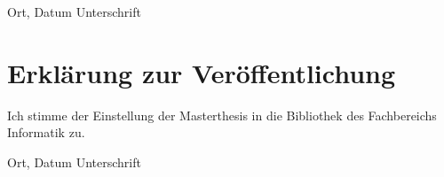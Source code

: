 \documentclass[12pt,final,twoside]{report}
\newcommand{\trtype}{Masterthesis} %
\theoremstyle{plain}
\theoremstyle{definition}
\theoremstyle{remark}
\begin{document}
\vspace{4cm}
\noindent Ort, Datum \hfill Unterschrift

\newpage
\thispagestyle{empty}
\hspace{1cm}
\newpage

\vspace{2cm}
\chapter*{Erkl\"arung zur Ver\"offentlichung}
\label{sec:erklaerung}
Ich stimme der Einstellung der \trtype{} in die Bibliothek des Fachbereichs Informatik zu.

\vspace{4cm}
\noindent Ort, Datum \hfill Unterschrift

\newpage
\thispagestyle{empty}
\hspace{1cm}
\newpage
\end{document}
